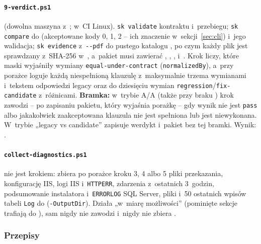 \paragraph{\texttt{9-verdict.ps1}} (dowolna maszyna z~; w~CI Linux).
\texttt{sk validate} kontraktu i~przebiegu; \texttt{sk compare} do 
(akceptowane kody 0, 1, 2 -- ich znaczenie w~sekcji~\ref{sec:cli}) i~jego walidacja;
\texttt{sk evidence} z~\texttt{-{}-pdf} do pustego katalogu , po czym
każdy plik jest sprawdzany z~SHA-256 w~, a~pakiet musi zawierać
, , , 
i~. Krok liczy, które maski wyjaśniły wymiany
\texttt{equal-under-contract} (\texttt{normalizedBy}), a~przy porażce loguje każdą
niespełnioną klauzulę z~maksymalnie trzema wymianami i~tekstem odpowiedzi legacy oraz do
dziesięciu wymian \texttt{regression}/\texttt{fix-candidate} z~różnicami.
\textbf{Bramka:} w~trybie A/A (także przy braku ) krok zawodzi -- po
zapisaniu pakietu, który wyjaśnia porażkę -- gdy wynik nie jest \texttt{pass} albo
jakakolwiek zaakceptowana klauzula nie jest spełniona lub jest niewykonana. W~trybie
„legacy vs candidate” zapisuje werdykt i~pakiet bez tej bramki. Wynik:
.

\paragraph{\texttt{collect-diagnostics.ps1}} nie jest krokiem: zbiera po porażce kroku
3, 4 albo 5 pliki przekazania, konfigurację IIS, logi IIS i~\texttt{HTTPERR}, zdarzenia
z~ostatnich 3~godzin, podsumowanie instalatora i~\texttt{ERRORLOG} SQL Server, pliki
 i~50 ostatnich wpisów tabeli \texttt{Log} do 
(\texttt{-OutputDir}). Działa „w~miarę możliwości” (pominięte sekcje trafiają do
), sam nigdy nie zawodzi i~nigdy nie zbiera .


\subsubsection{Przepisy}\label{sec:bench-przepisy}

